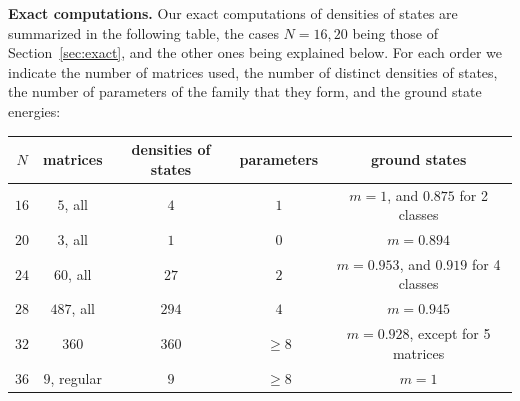 \documentclass[11pt,a4paper]{article}
\theoremstyle{remark}
\begin{document}
\noindent\textbf{Exact computations.} Our exact computations of densities of states are summarized in the following table, the cases $N=16,20$ being those of Section~\ref{sec:exact}, and the other ones being explained below. For each order we indicate the number of matrices used, the number of distinct densities of states, the number of parameters of the family that they form, and the ground state energies:

\begin{center}
\begin{tabular}{|c|c|c|c|c|}
\hline
$N$ & matrices & densities of states & parameters & ground states\\
\hline
$16$ & $5$, all & $4$ & $1$ & $m=1$, and $0.875$ for 2 classes\\
$20$ & $3$, all & $1$ & $0$ & $m=0.894$\\
$24$ & $60$, all & $27$ & $2$ & $m=0.953$, and $0.919$ for 4 classes\\
$28$ & $487$, all & $294$ & $4$ & $m=0.945$\\
$32$ & $360$ & $360$ & $\geq8$ & $m=0.928$, except for 5 matrices\\
$36$ & $9$, regular & $9$ & $\geq8$ & $m=1$\\
\hline
\end{tabular}
\end{center}

\medskip

\medskip
\end{document}
